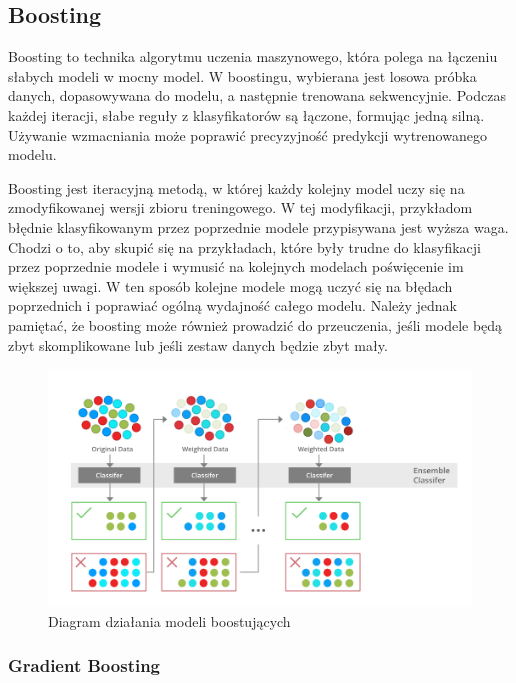 \documentclass[12pt,a4paper]{article}
\begin{document}
\subsection{Boosting}
\label{sec:boosting}
Boosting to technika algorytmu uczenia maszynowego, która polega na łączeniu słabych modeli w mocny model. 
W boostingu, wybierana jest losowa próbka danych, dopasowywana do modelu, a następnie trenowana sekwencyjnie.
Podczas każdej iteracji, słabe reguły z klasyfikatorów są łączone, formując jedną silną. Używanie wzmacniania może poprawić precyzyjność predykcji wytrenowanego modelu.  \cite{boosting-1}


Boosting jest iteracyjną metodą, w której każdy kolejny model uczy się na zmodyfikowanej wersji zbioru treningowego. W tej modyfikacji, przykładom błędnie klasyfikowanym przez poprzednie modele przypisywana jest wyższa waga. Chodzi o to, aby skupić się na przykładach, które były trudne do klasyfikacji przez poprzednie modele i wymusić na kolejnych modelach poświęcenie im większej uwagi. W ten sposób kolejne modele mogą uczyć się na błędach poprzednich i poprawiać ogólną wydajność całego modelu. Należy jednak pamiętać, że boosting może również prowadzić do przeuczenia, jeśli modele będą zbyt skomplikowane lub jeśli zestaw danych będzie zbyt mały. \cite{boosting-2} 

\begin{figure}[H]
    \centering
    \includegraphics[width=1\linewidth]{images/boosting-diagram.png}
    \caption{Diagram działania modeli boostujących \cite{boosting-diagram}}
\end{figure}

\subsubsection{Gradient Boosting}
\label{sec:gradient-boosting}
\end{document}
